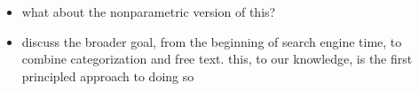 \begin{itemize}
\item what about the nonparametric version of this?
\item discuss the broader goal, from the beginning of search engine time, to combine categorization and free text.  this, to our knowledge, is the first principled approach to doing so
\end{itemize}
